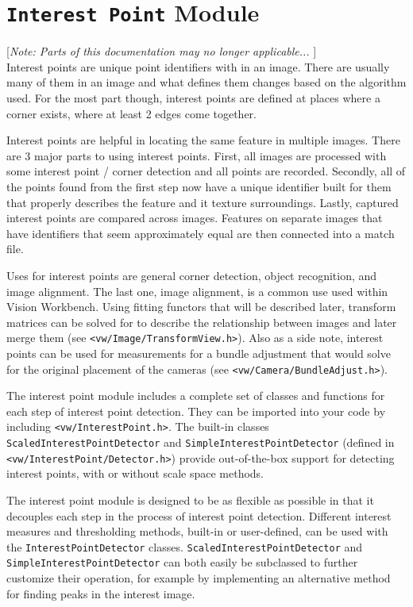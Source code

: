 \chapter{{\tt Interest Point} Module}\label{ch:interestpoint-module}

[{\em Note: Parts of this documentation may no longer applicable... }]
$$
$$
Interest points are unique point identifiers with in an image. There
are usually many of them in an image and what defines them changes
based on the algorithm used. For the most part though, interest points
are defined at places where a corner exists, where at least 2 edges
come together.

Interest points are helpful in locating the same feature in multiple
images. There are 3 major parts to using interest points. First, all
images are processed with some interest point / corner detection and
all points are recorded. Secondly, all of the points found from the
first step now have a unique identifier built for them that properly
describes the feature and it texture surroundings. Lastly, captured
interest points are compared across images. Features on separate
images that have identifiers that seem approximately equal are then
connected into a match file.

Uses for interest points are general corner detection, object
recognition, and image alignment. The last one, image alignment, is a
common use used within Vision Workbench. Using fitting functors that
will be described later, transform matrices can be solved for to
describe the relationship between images and later merge them (see
{\tt <vw/Image/TransformView.h>}). Also as a side note, interest points
can be used for measurements for a bundle adjustment that would solve
for the original placement of the cameras (see
{\tt <vw/Camera/BundleAdjust.h>}).

The interest point module includes a complete set of classes and
functions for each step of interest point detection. They can be
imported into your code by including {\tt <vw/InterestPoint.h>}. The
built-in classes {\tt ScaledInterestPointDetector} and
{\tt SimpleInterestPointDetector} (defined in {\tt
  <vw/InterestPoint/Detector.h>}) provide out-of-the-box support for
detecting interest points, with or without scale space methods.

The interest point module is designed to be as flexible as possible in
that it decouples each step in the process of interest point
detection. Different interest measures and thresholding methods,
built-in or user-defined, can be used with the 
{\tt InterestPointDetector} classes. {\tt ScaledInterestPointDetector}
and {\tt SimpleInterestPointDetector} can both easily be subclassed to
further customize their operation, for example by implementing an
alternative method for finding peaks in the interest image.

